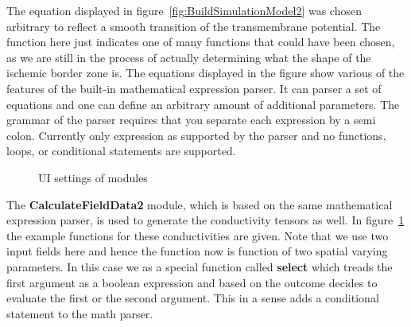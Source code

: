 \documentclass[fleqn,11pt,openany]{book}
\begin{document}
The equation displayed in figure~\ref{fig:BuildSimulationModel2} was chosen arbitrary to reflect a smooth transition of the transmembrane potential. The function here just indicates one of many functions that could have been chosen, as we are still in the process of actually determining what the shape of the ischemic border zone is. The equations displayed in the figure show various of the features of the built-in mathematical expression parser. It can parser a set of equations and one can define an arbitrary amount of additional parameters. The grammar of the parser requires that you separate each expression by a semi colon. Currently only expression as supported by the parser and no functions, loops, or conditional statements are supported.

\begin{figure}
\caption{UI settings of modules}\label{fig:BuildSimulationModel3}
\end{figure}

The {\bf CalculateFieldData2} module, which is based on the same mathematical expression parser, is used to generate the conductivity tensors as well. In figure~\ref{fig:BuildSimulationModel3} the example functions for these conductivities are given. Note that we use two input fields here and hence the function now is function of two spatial varying parameters. In this case we as a special function called {\bf select} which treads the first argument as a boolean expression and based on the outcome decides to evaluate the first or the second argument. This in a sense adds a conditional statement to the math parser. 
\end{document}

